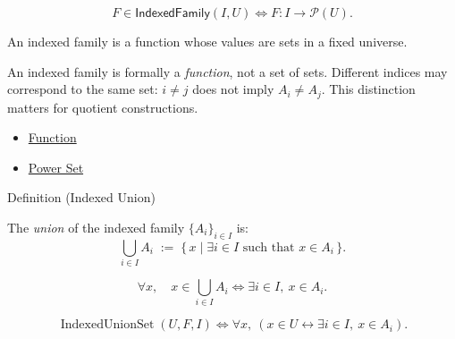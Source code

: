 \begin{remark*}
\[
  F\in\mathsf{IndexedFamily}(I,U)
  \iff
  F:I\to\mathcal{P}(U).
\]
\end{remark*}

\begin{remark*}[Interpretation]
An indexed family is a function whose values are sets in a fixed universe.
\end{remark*}

\begin{remark*}[Exposition]
An indexed family is formally a \emph{function}, not a set of sets.
Different indices may correspond to the same set: $i \neq j$ does not imply
$A_i \neq A_j$. This distinction matters for quotient constructions.
\end{remark*}


\begin{dependencies}
\begin{itemize}
  \item \hyperref[def:function]{Function}
  \item \hyperref[def:power-set]{Power Set}
\end{itemize}
\end{dependencies}

\begin{definitionbox}{Definition (Indexed Union)}
\begin{definition}\label{def:indexed-union}
The \emph{union} of the indexed family $\{A_i\}_{i \in I}$ is:
\[
\bigcup_{i \in I} A_i
\;:=\;
\{\, x \mid \exists i \in I \text{ such that } x \in A_i \,\}.
\]
\end{definition}
\end{definitionbox}

\begin{remark*}
\[
  \forall x,\quad
  x\in\bigcup_{i\in I}A_i
  \iff
  \exists i\in I,\ x\in A_i.
\]
\end{remark*}

\begin{remark*}
\[
  \operatorname{IndexedUnionSet}(U,F,I)
  \iff
  \forall x,\ (x\in U\leftrightarrow \exists i\in I,\ x\in A_i).
\]
\end{remark*}

